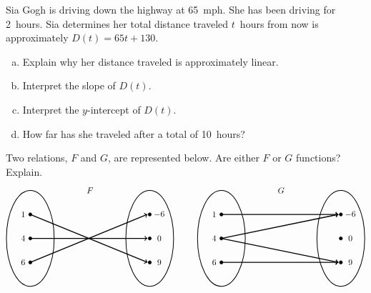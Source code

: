 \documentclass[11pt,letterpaper]{article}
\begin{document}
\prob Sia Gogh is driving down the highway at 65~mph. She has been driving for 2~hours. Sia determines her total distance traveled $t$~hours from now is approximately $D(t)= 65t + 130$. 
	\begin{enumerate}[(a)]
	\item Explain why her distance traveled is approximately linear.
	\item Interpret the slope of $D(t)$.
	\item Interpret the $y$-intercept of $D(t)$. 
	\item How far has she traveled after a total of 10~hours?
	\end{enumerate} \pspace


\prob Two relations, $F$ and $G$, are represented below. Are either $F$ or $G$ functions? Explain. 
	\[
	\begin{tikzpicture}
	\node at (2.5,2) {$F$};
	\draw[line width=0.03cm] (0,0) circle (1 and 2);
	\draw[line width=0.03cm] (5,0) circle (1 and 2);
	
	\draw[fill=black] (0,1) circle (0.07);
	\draw[fill=black] (0,0) circle (0.07);
	\draw[fill=black] (0,-1) circle (0.07);
	
	\draw[fill=black] (5,1) circle (0.07);
	\draw[fill=black] (5,0) circle (0.07);
	\draw[fill=black] (5,-1) circle (0.07);
	
	\draw[line width=0.04cm,->] (0,1) -- (4.9,-1);
	\draw[line width=0.04cm,->] (0,0) -- (4.9,0);
	\draw[line width=0.04cm,->] (0,-1) -- (4.9,1);
	
	\node at (-0.3,1) {$1$};
	\node at (-0.3,0) {$4$};
	\node at (-0.3,-1) {$6$};
	
	\node at (5.4,1) {$-6$};
	\node at (5.4,0) {$0$};
	\node at (5.4,-1) {$9$};
	
	\tikzset{shift={(8,0)}}
	\node at (2.5,2) {$G$};
	\draw[line width=0.03cm] (0,0) circle (1 and 2);
	\draw[line width=0.03cm] (5,0) circle (1 and 2);
	
	\draw[fill=black] (0,1) circle (0.07);
	\draw[fill=black] (0,0) circle (0.07);
	\draw[fill=black] (0,-1) circle (0.07);
	
	\draw[fill=black] (5,1) circle (0.07);
	\draw[fill=black] (5,0) circle (0.07);
	\draw[fill=black] (5,-1) circle (0.07);
	
	\draw[line width=0.04cm,->] (0,1) -- (4.9,1);
	\draw[line width=0.04cm,->] (0,0) -- (4.9,1);
	\draw[line width=0.04cm,->] (0,0) -- (4.9,-1);
	\draw[line width=0.04cm,->] (0,-1) -- (4.9,-1);
	
	\node at (-0.3,1) {$1$};
	\node at (-0.3,0) {$4$};
	\node at (-0.3,-1) {$6$};
	
	\node at (5.4,1) {$-6$};
	\node at (5.4,0) {$0$};
	\node at (5.4,-1) {$9$};
	\end{tikzpicture}
	\] \pspace
  
\end{document}
